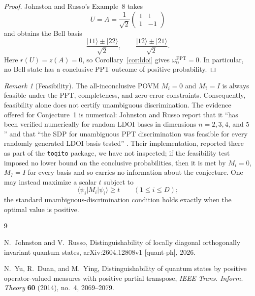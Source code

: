 \documentclass[11pt]{amsart}
\theoremstyle{remark}
\newtheorem{remark}[theorem]{Remark}
\newcommand{\ket}[1]{\lvert #1\rangle}
\newcommand{\bra}[1]{\langle #1\rvert}
\begin{document}
\begin{proof}
Johnston and Russo's Example~8 takes
\[
  U=A=\frac{1}{\sqrt2}
  \begin{pmatrix}
    1&1\\
    1&-1
  \end{pmatrix}
\]
and obtains the Bell basis
\[
  \frac{\ket{11}\pm\ket{22}}{\sqrt2},
  \qquad
  \frac{\ket{12}\pm\ket{21}}{\sqrt2}.
\]
Here $r(U)=z(A)=0$, so Corollary~\ref{cor:ldoi} gives
$\omega^{\mathrm{PPT}}_0=0$. In particular, no Bell state has a conclusive PPT
outcome of positive probability.
\end{proof}

\begin{remark}[Feasibility]\label{rem:feasibility}
The all-inconclusive POVM $M_i=0$ and $M_{?}=I$ is always feasible under the
PPT, completeness, and zero-error constraints. Consequently, feasibility alone
does not certify unambiguous discrimination. The evidence offered for
Conjecture~1 is numerical: Johnston and Russo report that it ``has been
verified numerically for random LDOI bases in dimensions $n=2,3,4$, and $5$''
and that ``the SDP for unambiguous PPT discrimination was feasible for every
randomly generated LDOI basis tested'' \cite{JohnstonRusso}. Their
implementation, reported there as part of the \texttt{toqito} package, we have
not inspected; if the feasibility test imposed no lower bound on the conclusive
probabilities, then it is met by $M_i=0$, $M_{?}=I$ for every basis and so
carries no information about the conjecture. One may instead maximize a scalar
$t$ subject to
\[
  \bra{\psi_i}M_i\ket{\psi_i}\geq t
  \qquad(1\leq i\leq D);
\]
the standard unambiguous-discrimination condition holds exactly when the
optimal value is positive.
\end{remark}

\begin{thebibliography}{9}

N.~Johnston and V.~Russo,
\newblock Distinguishability of locally diagonal orthogonally invariant
quantum states,
\newblock arXiv:2604.12808v1 [quant-ph], 2026.

N.~Yu, R.~Duan, and M.~Ying,
\newblock Distinguishability of quantum states by positive operator-valued
measures with positive partial transpose,
\newblock \emph{IEEE Trans. Inform. Theory} \textbf{60} (2014), no.~4,
2069--2079.

\end{thebibliography}
\end{document}

